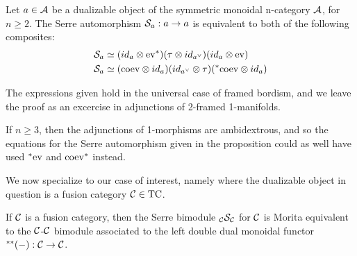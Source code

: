 \documentclass{amsart}
\begin{document}
\begin{proposition} \label{prop-serrecomp}
Let $a \in \mathcal A$ be a dualizable object of the symmetric monoidal n-category $\mathcal A$, for $n \geq 2$.  The Serre automorphism $\mathcal S_a : a \rightarrow a$ is equivalent to both of the following composites:
\begin{align}
\mathcal S_a & \simeq (id_a \otimes {\mathrm{ev}}^*) (\tau \otimes id_{a^{\vee}}) (id_a \otimes \mathrm{ev}) \nonumber\\
\mathcal S_a & \simeq (\mathrm{coev} \otimes id_a) (id_{a^{\vee}} \otimes \tau) ({}^*{\mathrm{coev}} \otimes id_a) \nonumber
\end{align}
\end{proposition}

The expressions given hold in the universal case of framed bordism, and we leave the proof as an excercise in adjunctions of 2-framed 1-manifolds.

\begin{remark}
If $n \geq 3$, then the adjunctions of 1-morphisms are ambidextrous, and so the equations for the Serre automorphism given in the proposition could as well have used ${}^*{\mathrm{ev}}$ and ${\mathrm{coev}}^*$ instead.
\end{remark}


We now specialize to our case of interest, namely where the dualizable object in question is a fusion category $\mathcal C \in \mathrm{TC}$.


\begin{theorem} \label{thm-serre}
If $\mathcal C$ is a fusion category, then the Serre bimodule ${}_{\mathcal C} {\mathcal S}_{\mathcal C}$ for $\mathcal C$ is Morita equivalent to the $\mathcal C$-$\mathcal C$ bimodule associated to the left double dual monoidal functor ${}^{**}{(-)}: \mathcal C \rightarrow \mathcal C$.
\end{theorem}
\end{document}
